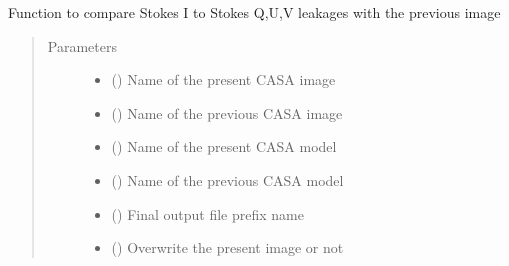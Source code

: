 \documentclass[letterpaper,10pt,english]{sphinxmanual}
\begin{document}
\begin{fulllineitems}
\begin{fulllineitems}
\label{\detokenize{paircars:paircars.fullpol_selfcal_LTS.PolSelfcal.compare_leakages}}
\sphinxAtStartPar
Function to compare Stokes I to Stokes Q,U,V leakages with the previous image
\begin{quote}\begin{description}
\item[{Parameters}] \leavevmode\begin{itemize}
\item {} 
\sphinxAtStartPar
{} () \textendash{} Name of the present CASA image

\item {} 
\sphinxAtStartPar
{} () \textendash{} Name of the previous CASA image

\item {} 
\sphinxAtStartPar
{} () \textendash{} Name of the present CASA model

\item {} 
\sphinxAtStartPar
{} () \textendash{} Name of the previous CASA model

\item {} 
\sphinxAtStartPar
{} () \textendash{} Final output file prefix name

\item {} 
\sphinxAtStartPar
{} () \textendash{} Overwrite the present image or not


\end{itemize}
\end{description}
\end{quote}
\end{fulllineitems}
\end{fulllineitems}
\end{document}
